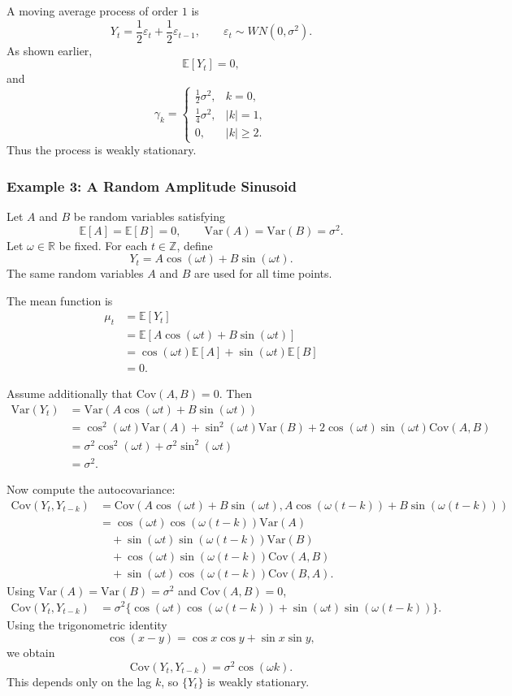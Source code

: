 \documentclass[12pt,oneside]{book}
\numberwithin{equation}{section}
\theoremstyle{definition}
\theoremstyle{plain}
\theoremstyle{remark}
\newcommand{\R}{\mathbb{R}}
\newcommand{\Z}{\mathbb{Z}}
\newcommand{\E}{\mathbb{E}}
\newcommand{\Var}{\mathrm{Var}}
\newcommand{\Cov}{\mathrm{Cov}}
\begin{document}
A moving average process of order $1$ is
\[
Y_t=\frac{1}{2}\varepsilon_t+\frac{1}{2}\varepsilon_{t-1},
\qquad
\varepsilon_t\sim WN(0,\sigma^2).
\]
As shown earlier,
\[
\E[Y_t]=0,
\]
and
\[
\gamma_k
=
\begin{cases}
\frac{1}{2}\sigma^2, & k=0,\\
\frac{1}{4}\sigma^2, & |k|=1,\\
0, & |k|\geq 2.
\end{cases}
\]
Thus the process is weakly stationary.

\subsubsection{Example 3: A Random Amplitude Sinusoid}

Let $A$ and $B$ be random variables satisfying
\[
\E[A]=\E[B]=0,
\qquad
\Var(A)=\Var(B)=\sigma^2.
\]
Let $\omega\in\R$ be fixed. For each $t\in\Z$, define
\[
Y_t=A\cos(\omega t)+B\sin(\omega t).
\]
The same random variables $A$ and $B$ are used for all time points.

The mean function is
\begin{align*}
\mu_t
&=
\E[Y_t] \\
&=
\E[A\cos(\omega t)+B\sin(\omega t)] \\
&=
\cos(\omega t)\E[A]+\sin(\omega t)\E[B] \\
&=
0.
\end{align*}

Assume additionally that $\Cov(A,B)=0$. Then
\begin{align*}
\Var(Y_t)
&=
\Var(A\cos(\omega t)+B\sin(\omega t)) \\
&=
\cos^2(\omega t)\Var(A)
+
\sin^2(\omega t)\Var(B)
+
2\cos(\omega t)\sin(\omega t)\Cov(A,B) \\
&=
\sigma^2\cos^2(\omega t)+\sigma^2\sin^2(\omega t) \\
&=
\sigma^2.
\end{align*}

Now compute the autocovariance:
\begin{align*}
\Cov(Y_t,Y_{t-k})
&=
\Cov(A\cos(\omega t)+B\sin(\omega t),
A\cos(\omega(t-k))+B\sin(\omega(t-k))) \\
&=
\cos(\omega t)\cos(\omega(t-k))\Var(A) \\
&\quad
+
\sin(\omega t)\sin(\omega(t-k))\Var(B) \\
&\quad
+
\cos(\omega t)\sin(\omega(t-k))\Cov(A,B) \\
&\quad
+
\sin(\omega t)\cos(\omega(t-k))\Cov(B,A).
\end{align*}
Using $\Var(A)=\Var(B)=\sigma^2$ and $\Cov(A,B)=0$,
\begin{align*}
\Cov(Y_t,Y_{t-k})
&=
\sigma^2\{\cos(\omega t)\cos(\omega(t-k))
+
\sin(\omega t)\sin(\omega(t-k))\}.
\end{align*}
Using the trigonometric identity
\[
\cos(x-y)=\cos x\cos y+\sin x\sin y,
\]
we obtain
\[
\Cov(Y_t,Y_{t-k})
=
\sigma^2\cos(\omega k).
\]
This depends only on the lag $k$, so $\{Y_t\}$ is weakly stationary.
\end{document}
